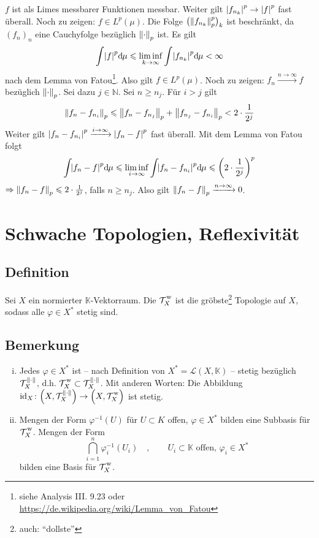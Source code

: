 $f$ ist als Limes messbarer Funktionen messbar. Weiter gilt $\abs*{f_{n_k}}^p \to \abs*{f}^p$ fast überall. 
Noch zu zeigen: $f \in L^p(\mu)$. Die Folge $\enbrace[\big]{\norm[p]{f_{n_k}}^p}_{k}$ ist beschränkt, da $(f_n)_{n}$ eine Cauchyfolge bezüglich $\norm[p]{\cdot}$ ist. Es gilt
\[
	\int \abs*{f}^p \mathd \mu \le \liminf\limits_{k \to \infty} \int \abs*{f_{n_k}}^p \mathd \mu < \infty
\]
nach dem Lemma von Fatou\footnote{siehe Analysis III. 9.23 oder \url{https://de.wikipedia.org/wiki/Lemma_von_Fatou}}. Also gilt $f \in L^p(\mu)$.
Noch zu zeigen: $f_n \xrightarrow{n \to \infty} f$ bezüglich $\norm[p]{\cdot }$. Sei dazu $j \in \mathds{N}$. Sei $n \ge n_j$. Für $i>j$ gilt
\[
	\norm[p]{f_n - f_{n_i}} \le \norm[p]{f_n - f_{n_j}} + \norm[p]{f_{n_j}- f_{n_i}} < 2 \cdot \frac{1}{2^j}    
\]
Weiter gilt $\abs*{f_{n}- f_{n_i}}^p \xrightarrow{i \to \infty} \abs*{f_n -f}^p$ fast überall. Mit dem Lemma von Fatou folgt 
\[
	\int\!\abs*{f_n- f}^p \mathd\mu \le \liminf_{i \to \infty} \int \! \abs*{f_n - f_{n_i}}^p \mathd\mu  \le \enbrace*{2 \cdot \frac{1}{2^j}}^p
\]
$\Rightarrow \norm[p]{f_n -f} \le 2 \cdot \frac{1}{2^j}$, falls $n \ge n_j$. Also gilt $\norm[p]{f_n -f} \xrightarrow{n \to \infty} 0 $. \bewende
\newpage

\section{Schwache Topologien, Reflexivität} %
\label{sec:5}
\subsection[Definition: Schwache Topologie]{Definition} %
\label{sub:51}
Sei $X$ ein normierter $\mathds{K}$-Vektorraum. Die  $\weakT{X}$ ist die gröbste\footnote{auch: \enquote{dollste}} Topologie auf $X$, sodass alle 
$\varphi \in X^*$ stetig sind. 

\subsection[Bemerkungen zur schwachen Topologie]{Bemerkung} %
\label{sub:52}
\begin{enumerate}[(i)]
	\item Jedes $\varphi \in X^*$ ist -- nach Definition von $X^*=\mathcal{L}(X,\mathds{K})$ -- stetig bezüglich $\mathcal{T}^{\norm{\cdot}}_X$, d.h. 
	$\weakT{X} \subset \mathcal{T}_X^{\norm{\cdot}}$. Mit anderen Worten: Die Abbildung 
	$\id_X \colon \enbrace*{X,\mathcal{T}_X^{\norm{\cdot}}}\to\enbrace[\Big]{X,\weakT{X}}$ ist stetig.
	\item Mengen der Form $\varphi ^{-1}(U)$ für $U \subset K$ offen, $\varphi \in X^*$ bilden eine Subbasis für $\weakT{X}$. Mengen der Form 
	\[
		\bigcap_{i=1}^n \varphi_i ^{-1} (U_i) \quad, \qquad U_i \subset \mathds{K} \text{ offen, } \varphi_i \in X^*
	\]
	bilden eine Basis für $\weakT{X}$.
\end{enumerate}

